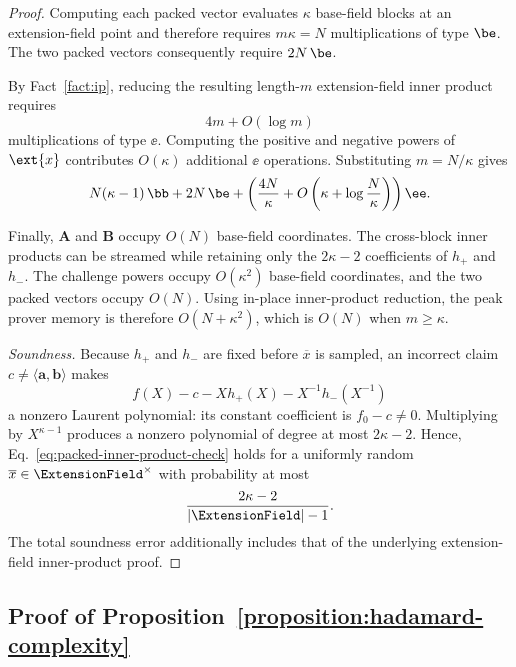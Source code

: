 \begin{proof}
Computing each packed vector evaluates \(\kappa\) base-field
blocks at an extension-field point and therefore requires
\(m\kappa=N\) multiplications of type \(\be\). The two packed
vectors consequently require \(2N\,\be\).

By Fact~\ref{fact:ip}, reducing the resulting length-\(m\)
extension-field inner product requires
\[
    4m+O(\log m)
\]
multiplications of type \(\ee\). Computing the positive and
negative powers of \(\ext{x}\) contributes \(O(\kappa)\)
additional \(\ee\) operations. Substituting \(m=N/\kappa\) gives
\[
    N(\kappa-1)\,\bb
    +
    2N\,\be
    +
    \left(
        \frac{4N}{\kappa}
        +
        O\left(
            \kappa+\log\frac{N}{\kappa}
        \right)
    \right)\ee.
\]

Finally, \(\bm A\) and \(\bm B\) occupy \(O(N)\) base-field
coordinates. The cross-block inner products can be streamed while
retaining only the \(2\kappa-2\) coefficients of \(h_+\) and
\(h_-\). The challenge powers occupy \(O(\kappa^2)\) base-field
coordinates, and the two packed vectors occupy \(O(N)\).
Using in-place inner-product reduction, the peak prover memory is
therefore \(O(N+\kappa^2)\), which is \(O(N)\) when
\(m\geq\kappa\).


\emph{Soundness.}
Because \(h_+\) and \(h_-\) are fixed before \(\overline{x}\) is
sampled, an incorrect claim \(c\neq\langle\bm a,\bm b\rangle\)
makes
\[
    f(X)-c-Xh_+(X)-X^{-1}h_-(X^{-1})
\]
a nonzero Laurent polynomial: its constant coefficient is
\(f_0-c\neq0\). Multiplying by \(X^{\kappa-1}\) produces a
nonzero polynomial of degree at most \(2\kappa-2\). Hence,
Eq.~\eqref{eq:packed-inner-product-check} holds for a uniformly
random \(\overline{x}\in\ExtensionField^{\times}\) with
probability at most
\[
    \frac{2\kappa-2}{|\ExtensionField|-1}.
\]
The total soundness error additionally includes that of the
underlying extension-field inner-product proof.
\end{proof}

\subsection{Proof of Proposition~\ref{proposition:hadamard-complexity}}
\label{appx:proof-hadamard}

